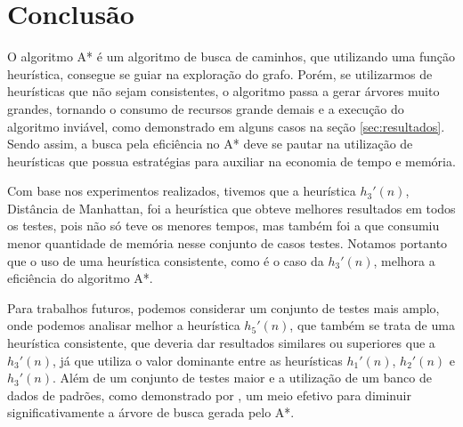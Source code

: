 \documentclass[12pt]{article}
\begin{document}
\section{Conclusão}

O algoritmo A* é um algoritmo de busca de caminhos, que utilizando uma função heurística, consegue se guiar na exploração do grafo. Porém, se utilizarmos de heurísticas que não sejam consistentes, o algoritmo passa a gerar árvores muito grandes, tornando o consumo de recursos grande demais e a execução do algoritmo inviável, como demonstrado em alguns casos na seção \ref{sec:resultados}. Sendo assim, a busca pela eficiência no A* deve se pautar na utilização de heurísticas que possua estratégias para auxiliar na economia de tempo e memória.

Com base nos experimentos realizados, tivemos que a heurística $h_{3}'(n)$, Distância de Manhattan, foi a heurística que obteve melhores resultados em todos os testes, pois não só teve os menores tempos, mas também foi a que consumiu menor quantidade de memória nesse conjunto de casos testes. Notamos portanto que o uso de uma heurística consistente, como é o caso da $h_{3}'(n)$, melhora a eficiência do algoritmo A*.

Para trabalhos futuros, podemos considerar um conjunto de testes mais amplo, onde podemos analisar melhor a heurística $h_{5}'(n)$, que também se trata de uma heurística consistente, que deveria dar resultados similares ou superiores que a $h_{3}'(n)$, já que utiliza o valor dominante entre as heurísticas $h_{1}'(n)$, $h_{2}'(n)$ e $h_{3}'(n)$. Além de um conjunto de testes maior e a utilização de um banco de dados de padrões, como demonstrado por \cite{searchingpatterndatabases}, um meio efetivo para diminuir significativamente a árvore de busca gerada pelo A*.




\end{document}
